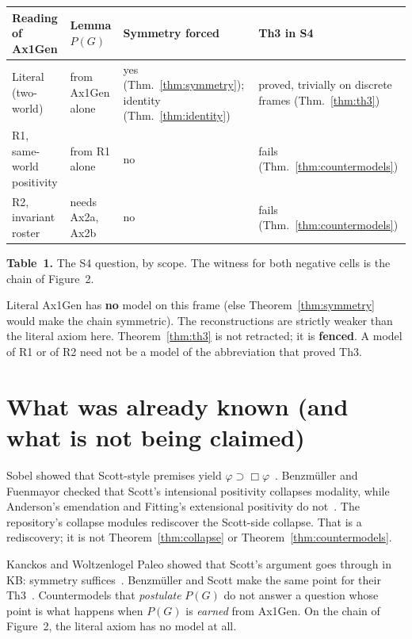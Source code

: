 \documentclass[11pt]{article}
\begin{document}
\begin{center}
\begin{tabular}{|p{}|p{}|p{}|p{}|}
\hline
\textbf{Reading of Ax1Gen} & \textbf{Lemma \(P(G)\)} & \textbf{Symmetry forced} & \textbf{Th3 in S4} \\
\hline
Literal (two-world) & from Ax1Gen alone & yes (Thm.~\ref{thm:symmetry}); identity (Thm.~\ref{thm:identity}) & proved, trivially on discrete frames (Thm.~\ref{thm:th3}) \\
\hline
R1, same-world positivity & from R1 alone & no & fails (Thm.~\ref{thm:countermodels}) \\
\hline
R2, invariant roster & needs Ax2a, Ax2b & no & fails (Thm.~\ref{thm:countermodels}) \\
\hline
\end{tabular}
\end{center}
\noindent\textbf{Table~1.} The S4 question, by scope. The witness for both negative cells is
the chain of Figure~2.

Literal Ax1Gen has \textbf{no} model on this frame (else Theorem~\ref{thm:symmetry} would
make the chain symmetric). The reconstructions are strictly weaker than the literal axiom
here. Theorem~\ref{thm:th3} is not retracted; it is \textbf{fenced}. A model of R1 or of R2
need not be a model of the abbreviation that proved Th3.

\section{What was already known (and what is not being claimed)}
\label{sec:prior}

Sobel showed that Scott-style premises yield \(\varphi \supset \Box\varphi\)~\cite{Sobel1987,Sobel2004}.
Benzm\"uller and Fuenmayor checked that Scott's intensional positivity collapses modality,
while Anderson's emendation and Fitting's extensional positivity do
not~\cite{BenzFu2020,Anderson1990,Fitting2002}. The repository's collapse modules rediscover
the Scott-side collapse. That is a rediscovery; it is not Theorem~\ref{thm:collapse} or
Theorem~\ref{thm:countermodels}.

Kanckos and Woltzenlogel Paleo showed that Scott's argument goes through in KB: symmetry
suffices~\cite{Kanckos2017}. Benzm\"uller and Scott make the same point for their
Th3~\cite{BenzScottAFP2025,BenzScott2025}. Countermodels that \emph{postulate} \(P(G)\) do
not answer a question whose point is what happens when \(P(G)\) is \emph{earned} from
Ax1Gen. On the chain of Figure~2, the literal axiom has no model at all.
\end{document}
